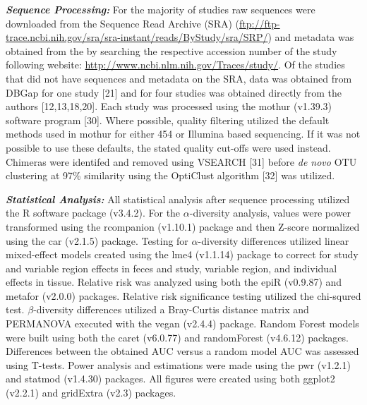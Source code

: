 \documentclass[12pt,]{article}
\begin{document}
\textbf{\emph{Sequence Processing:}} For the majority of studies raw
sequences were downloaded from the Sequence Read Archive (SRA)
(\url{ftp://ftp-trace.ncbi.nih.gov/sra/sra-instant/reads/ByStudy/sra/SRP/})
and metadata was obtained from the by searching the respective accession
number of the study following website:
\url{http://www.ncbi.nlm.nih.gov/Traces/study/}. Of the studies that did
not have sequences and metadata on the SRA, data was obtained from DBGap
for one study {[}21{]} and for four studies was obtained directly from
the authors {[}12,13,18,20{]}. Each study was processed using the mothur
(v1.39.3) software program {[}30{]}. Where possible, quality filtering
utilized the default methods used in mothur for either 454 or Illumina
based sequencing. If it was not possible to use these defaults, the
stated quality cut-offs were used instead. Chimeras were identifed and
removed using VSEARCH {[}31{]} before \emph{de novo} OTU clustering at
97\% similarity using the OptiClust algorithm {[}32{]} was utilized.

\textbf{\emph{Statistical Analysis:}} All statistical analysis after
sequence processing utilized the R software package (v3.4.2). For the
\(\alpha\)-diversity analysis, values were power transformed using the
rcompanion (v1.10.1) package and then Z-score normalized using the car
(v2.1.5) package. Testing for \(\alpha\)-diversity differences utilized
linear mixed-effect models created using the lme4 (v1.1.14) package to
correct for study and variable region effects in feces and study,
variable region, and individual effects in tissue. Relative risk was
analyzed using both the epiR (v0.9.87) and metafor (v2.0.0) packages.
Relative risk significance testing utilized the chi-squred test.
\(\beta\)-diversity differences utilized a Bray-Curtis distance matrix
and PERMANOVA executed with the vegan (v2.4.4) package. Random Forest
models were built using both the caret (v6.0.77) and randomForest
(v4.6.12) packages. Differences between the obtained AUC versus a random
model AUC was assessed using T-tests. Power analysis and estimations
were made using the pwr (v1.2.1) and statmod (v1.4.30) packages. All
figures were created using both ggplot2 (v2.2.1) and gridExtra (v2.3)
packages.
\end{document}
